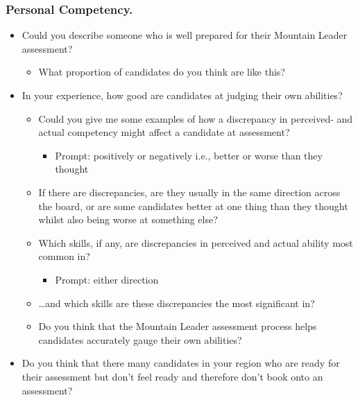 \documentclass[
  12pt,
  a4paper,
]{book}
\providecommand{\tightlist}{%
  \setlength{\itemsep}{0pt}\setlength{\parskip}{0pt}}
\begin{document}
\hypertarget{personal-competency.}{%
\subsubsection{Personal Competency.}\label{personal-competency.}}

\begin{itemize}
\tightlist
\item
  Could you describe someone who is well prepared for their Mountain Leader assessment?

  \begin{itemize}
  \tightlist
  \item
    What proportion of candidates do you think are like this?
  \end{itemize}
\item
  In your experience, how good are candidates at judging their own abilities?

  \begin{itemize}
  \tightlist
  \item
    Could you give me some examples of how a discrepancy in perceived- and actual competency might affect a candidate at assessment?

    \begin{itemize}
    \tightlist
    \item
      Prompt: positively or negatively i.e., better or worse than they thought
    \end{itemize}
  \item
    If there are discrepancies, are they usually in the same direction across the board, or are some candidates better at one thing than they thought whilst also being worse at something else?
  \item
    Which skills, if any, are discrepancies in perceived and actual ability most common in?

    \begin{itemize}
    \tightlist
    \item
      Prompt: either direction
    \end{itemize}
  \item
    \ldots and which skills are these discrepancies the most significant in?
  \item
    Do you think that the Mountain Leader assessment process helps candidates accurately gauge their own abilities?
  \end{itemize}
\item
  Do you think that there many candidates in your region who are ready for their assessment but don't feel ready and therefore don't book onto an assessment?


\end{itemize}
\end{document}
